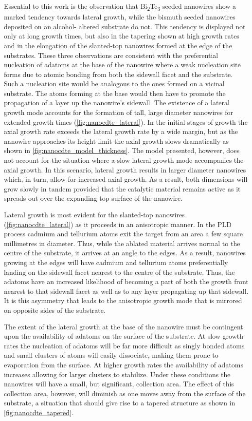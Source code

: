 Essential to this work is the observation that Bi\textsubscript{2}Te\textsubscript{3} seeded nanowires show a marked tendency towards lateral growth, while the bismuth seeded nanowires deposited on an alcohol- altered substrate do not.
This tendency is displayed not only at long growth times, but also in the tapering shown at high growth rates and in the elongation of the slanted-top nanowires formed at the edge of the substrates.
These three observations are consistent with the preferential nucleation of adatoms at the base of the nanowire where a weak nucleation site forms due to atomic bonding from both the sidewall facet and the substrate.
Such a nucleation site would be analogous to the ones formed on a vicinal substrate\cite{Ratsch2005a}.
The atoms forming at the base would then have to promote the propagation of a layer up the nanowire's sidewall.
The existence of a lateral growth mode accounts for the formation of tall, large diameter nanowires for extended growth times (\cref{fig:nanocdte_lateral}).
In the initial stages of growth the axial growth rate exceeds the lateral growth rate by a wide margin, but as the nanowire approaches its height limit the axial growth slows dramatically as shown in \cref{fig:nanocdte_model_thickness}.
The model presented, however, does not account for the situation where a slow lateral growth mode accompanies the axial growth.
In this scenario, lateral growth results in larger diameter nanowires which, in turn, allow for increased axial growth.
As a result, both dimensions will grow slowly in tandem provided that the catalytic material remains active as it spreads out over the expanding top surface of the nanowire.

Lateral growth is most evident for the slanted-top nanowires (\cref{fig:nanocdte_lateral}) as it proceeds in an anisotropic manner.
In the PLD process cadmium and tellurium atoms exit the target from an area a few square millimetres in diameter.
Thus, while the ablated material arrives normal to the centre of the substrate, it arrives at an angle to the edges.
As a result, nanowires growing at the edges will have cadmium and tellurium atoms preferentially landing on the sidewall facet nearest to the centre of the substrate.
Thus, the adatoms have an increased likelihood of becoming a part of both the growth front nearest to that sidewall facet as well as to any layer propagating up that sidewall.
It is this asymmetry that leads to the anisotropic growth mode that is mirrored on opposite sides of the substrate.

The extent of the lateral growth at the base of the nanowire must be contingent upon the availability of adatoms on the surface of the substrate.
At slow growth rates the nucleation of adatoms will be far more difficult as singly bonded atoms and small clusters of atoms will easily dissociate, making them prone to evaporation from the surface.
At higher growth rates the availability of adatoms increases allowing for larger clusters to stabilize.
Under these conditions the nanowires will have a small, but significant, collection area.
The effect of this collection area, however, will diminish as one moves away from the surface of the substrate, a situation that should give rise to a tapered structure as shown in \cref{fig:nanocdte_tapered}.


